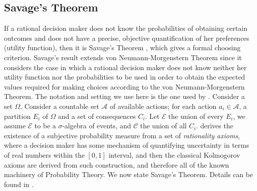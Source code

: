 \documentclass{svjour3}                     %
\begin{document}
\subsection{Savage's Theorem}
\label{savage_theorem}
If a rational decision maker does not know the probabilities of obtaining certain outcomes and does not have a precise, objective quantification of her preferences (utility function), then it is Savage's Theorem \citep{savage1954the}, which gives a formal choosing criterion. Savage's result extends von Neumann-Morgenstern Theorem since it considers the case in which a rational decision maker does not know neither her utility function nor the probabilities to be used in order to obtain the expected values required for making choices according to the von Neumann-Morgenstern Theorem. The notation and setting we use here is the one used by \cite{bernardo2000bayesian}. Consider a set $\Omega$. Consider a countable set $\mathcal{A}$ of available actions; for each action $a_i \in \mathcal{A}$, a partition $E_i$ of $\Omega$ and a set of consequences $C_i$. Let $\mathcal{E}$ the union of every $E_i$, we assume $\mathcal{E}$ to be a $\sigma$-algebra of events, and $\mathcal{C}$ the union of all $C_i$. \cite{bernardo2000bayesian} derives the existence of a subjective probability measure from a set of \textit{rationality axioms}, where a decision maker has some mechanism of quantifying uncertainty in terms of real numbers within the $[0,1]$ interval, and then the classical Kolmogorov axioms are derived from such construction, and therefore all of the known machinery of Probability Theory. We now state Savage's Theorem. Details can be found in \citep{kreps1988choice,bernardo2000bayesian,gilboa2009decision}.
\end{document}
